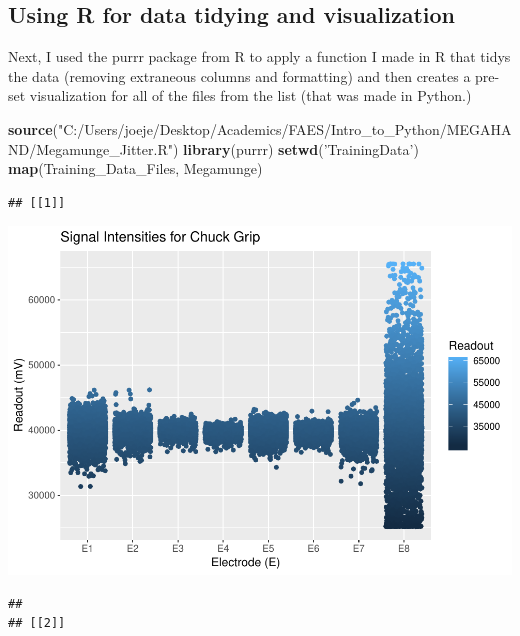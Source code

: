 \documentclass[]{article}
\newenvironment{Shaded}{\begin{snugshade}}{\end{snugshade}}
\newcommand{\KeywordTok}[1]{\textcolor[rgb]{0.13,0.29,0.53}{\textbf{#1}}}
\newcommand{\StringTok}[1]{\textcolor[rgb]{0.31,0.60,0.02}{#1}}
\newcommand{\NormalTok}[1]{#1}
\begin{document}
\subsection{Using R for data tidying and
visualization}\label{using-r-for-data-tidying-and-visualization}

Next, I used the purrr package from R to apply a function I made in R
that tidys the data (removing extraneous columns and formatting) and
then creates a pre-set visualization for all of the files from the list
(that was made in Python.)

\begin{Shaded}
\begin{Highlighting}[]
\KeywordTok{source}\NormalTok{(}\StringTok{"C:/Users/joeje/Desktop/Academics/FAES/Intro_to_Python/MEGAHAND/Megamunge_Jitter.R"}\NormalTok{)}
\KeywordTok{library}\NormalTok{(purrr)}
\KeywordTok{setwd}\NormalTok{(}\StringTok{'TrainingData'}\NormalTok{)}
\KeywordTok{map}\NormalTok{(Training_Data_Files, Megamunge)}
\end{Highlighting}
\end{Shaded}

\begin{verbatim}
## [[1]]
\end{verbatim}

\includegraphics{Megahand_files/figure-latex/unnamed-chunk-6-1.pdf}

\begin{verbatim}
## 
## [[2]]
\end{verbatim}
\end{document}
